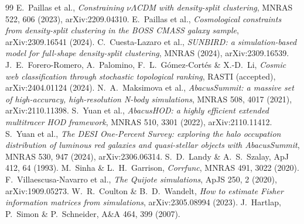\documentclass[11pt,twocolumn]{article}
\begin{document}
\begin{thebibliography}{99}
 E.~Paillas et al., \emph{Constraining $\nu\Lambda$CDM with density-split clustering}, MNRAS 522, 606 (2023), arXiv:2209.04310.
 E.~Paillas et al., \emph{Cosmological constraints from density-split clustering in the BOSS CMASS galaxy sample}, arXiv:2309.16541 (2024).
 C.~Cuesta-Lazaro et al., \emph{SUNBIRD: a simulation-based model for full-shape density-split clustering}, MNRAS (2024), arXiv:2309.16539.
 J.~E.~Forero-Romero, A.~Palomino, F.~L.~G\'omez-Cort\'es \& X.-D.~Li, \emph{Cosmic web classification through stochastic topological ranking}, RASTI (accepted), arXiv:2404.01124 (2024).
 N.~A.~Maksimova et al., \emph{AbacusSummit: a massive set of high-accuracy, high-resolution N-body simulations}, MNRAS 508, 4017 (2021), arXiv:2110.11398.
 S.~Yuan et al., \emph{AbacusHOD: a highly efficient extended multitracer HOD framework}, MNRAS 510, 3301 (2022), arXiv:2110.11412.
 S.~Yuan et al., \emph{The DESI One-Percent Survey: exploring the halo occupation distribution of luminous red galaxies and quasi-stellar objects with AbacusSummit}, MNRAS 530, 947 (2024), arXiv:2306.06314.
 S.~D.~Landy \& A.~S.~Szalay, ApJ 412, 64 (1993).
 M.~Sinha \& L.~H.~Garrison, \emph{Corrfunc}, MNRAS 491, 3022 (2020).
 F.~Villaescusa-Navarro et al., \emph{The Quijote simulations}, ApJS 250, 2 (2020), arXiv:1909.05273.
 W.~R.~Coulton \& B.~D.~Wandelt, \emph{How to estimate Fisher information matrices from simulations}, arXiv:2305.08994 (2023).
 J.~Hartlap, P.~Simon \& P.~Schneider, A\&A 464, 399 (2007).
\end{thebibliography}
\end{document}
